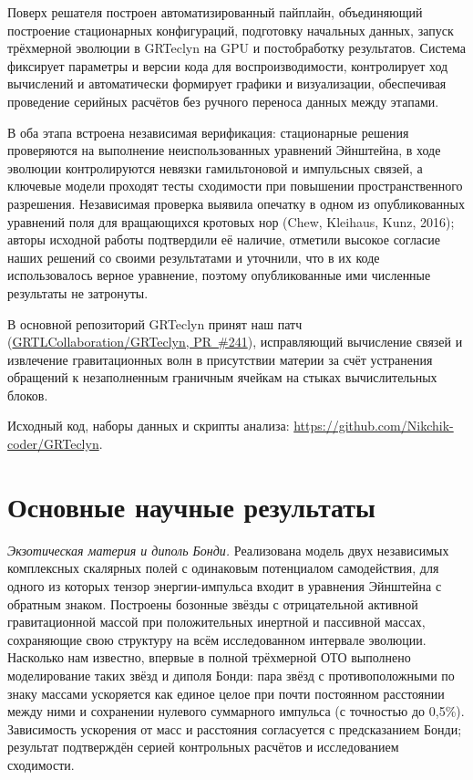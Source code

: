 \documentclass[11pt,a4paper]{article}
\begin{document}
Поверх решателя построен автоматизированный пайплайн, объединяющий построение стационарных конфигураций, подготовку начальных данных, запуск трёхмерной эволюции в GRTeclyn на GPU и постобработку результатов. Система фиксирует параметры и версии кода для воспроизводимости, контролирует ход вычислений и автоматически формирует графики и визуализации, обеспечивая проведение серийных расчётов без ручного переноса данных между этапами.

В оба этапа встроена независимая верификация: стационарные решения проверяются на выполнение неиспользованных уравнений Эйнштейна, в ходе эволюции контролируются невязки гамильтоновой и импульсных связей, а ключевые модели проходят тесты сходимости при повышении пространственного разрешения. Независимая проверка выявила опечатку в одном из опубликованных уравнений поля для вращающихся кротовых нор (Chew, Kleihaus, Kunz, 2016); авторы исходной работы подтвердили её наличие, отметили высокое согласие наших решений со своими результатами и уточнили, что в их коде использовалось верное уравнение, поэтому опубликованные ими численные результаты не затронуты.

В основной репозиторий GRTeclyn принят наш патч (\href{https://github.com/GRTLCollaboration/GRTeclyn/pull/241}{GRTLCollaboration/GRTeclyn, PR~\#241}), исправляющий вычисление связей и извлечение гравитационных волн в присутствии материи за счёт устранения обращений к незаполненным граничным ячейкам на стыках вычислительных блоков.

Исходный код, наборы данных и скрипты анализа: \url{https://github.com/Nikchik-coder/GRTeclyn}.

\newpage
\section*{Основные научные результаты}

\textit{Экзотическая материя и диполь Бонди.} Реализована модель двух независимых комплексных скалярных полей с одинаковым потенциалом самодействия, для одного из которых тензор энергии-импульса входит в уравнения Эйнштейна с обратным знаком. Построены бозонные звёзды с отрицательной активной гравитационной массой при положительных инертной и пассивной массах, сохраняющие свою структуру на всём исследованном интервале эволюции. Насколько нам известно, впервые в полной трёхмерной ОТО выполнено моделирование таких звёзд и диполя Бонди: пара звёзд с противоположными по знаку массами ускоряется как единое целое при почти постоянном расстоянии между ними и сохранении нулевого суммарного импульса (с точностью до 0,5\%). Зависимость ускорения от масс и расстояния согласуется с предсказанием Бонди; результат подтверждён серией контрольных расчётов и исследованием сходимости.
\end{document}
